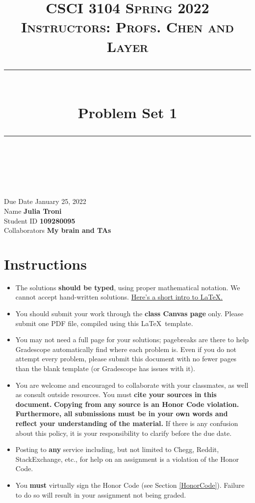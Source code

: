 \documentclass[11pt]{article}
\title{
\normalfont \normalsize 
\textsc{CSCI 3104 Spring 2022 \\ 
Instructors: Profs. Chen and Layer} \\
[10pt] 
\rule{\linewidth}{0.5pt} \\[6pt] 
\huge Problem Set 1 \\
\rule{\linewidth}{2pt}  \\[10pt]
}
\date{}
\theoremstyle{definition}
\theoremstyle{definition}
\theoremstyle{definition}
\begin{document}

\maketitle


\noindent
Due Date \dotfill January 25, 2022 \\
Name \dotfill \textbf{Julia Troni} \\
Student ID \dotfill \textbf{109280095} \\
Collaborators \dotfill \textbf{My brain and TAs}

\tableofcontents

\section{Instructions}
 \begin{itemize}
	\item The solutions \textbf{should be typed}, using proper mathematical notation. We cannot accept hand-written solutions. \href{http://ece.uprm.edu/~caceros/latex/introduction.pdf}{Here's a short intro to \LaTeX.}
	\item You should submit your work through the \textbf{class Canvas page} only. Please submit one PDF file, compiled using this \LaTeX \ template.
	\item You may not need a full page for your solutions; pagebreaks are there to help Gradescope automatically find where each problem is. Even if you do not attempt every problem, please submit this document with no fewer pages than the blank template (or Gradescope has issues with it).

	\item You are welcome and encouraged to collaborate with your classmates, as well as consult outside resources. You must \textbf{cite your sources in this document.} \textbf{Copying from any source is an Honor Code violation. Furthermore, all submissions must be in your own words and reflect your understanding of the material.} If there is any confusion about this policy, it is your responsibility to clarify before the due date. 

	\item Posting to \textbf{any} service including, but not limited to Chegg, Reddit, StackExchange, etc., for help on an assignment is a violation of the Honor Code.

	\item You \textbf{must} virtually sign the Honor Code (see Section \ref{HonorCode}). Failure to do so will result in your assignment not being graded.
\end{itemize}
\end{document}
